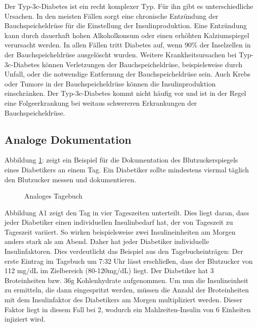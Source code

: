 \documentclass[a4paper,11pt]{article}%
\renewcommand{\\}{\vspace*{0.5\baselineskip} \newline}
\begin{document}
	Der Typ-3c-Diabetes ist ein recht komplexer Typ. Für ihn gibt es unterschiedliche Ursachen. In den meisten Fällen sorgt eine chronische Entzündung der Bauchspeicheldrüse für die Einstellung der Insulinproduktion. Eine Entzündung kann durch dauerhaft hohen Alkoholkonsum oder einen erhöhten Kalziumspiegel verursacht werden. In allen Fällen tritt Diabetes auf, wenn 90\% der Inselzellen in der Bauchspeicheldrüse ausgelöscht wurden. Weitere Krankheitsursachen bei Typ-3c-Diabetes können Verletzungen der Bauchspeicheldrüse, beispielsweise durch Unfall, oder die notwendige Entfernung der Bauchspeicheldrüse sein. Auch Krebs oder Tumore in der Bauchspeicheldrüse können die Insulinproduktion einschränken. Der Typ-3c-Diabetes kommt nicht häufig vor und ist in der Regel eine Folgeerkrankung bei weitaus schwereren Erkrankungen der Bauchspeicheldrüse. \cite{SG}
	\subsection{Analoge Dokumentation}
	Abbildung \ref{img:tagebuch}: \glqq {}\grqq{} zeigt ein Beispiel für die Dokumentation des Blutzuckerspiegels eines Diabetikers an einem Tag. Ein Diabetiker sollte mindestens viermal täglich den Blutzucker messen und dokumentieren.
	\begin{figure}[H]
		\centering
		\setlength{\fboxsep}{1pt}
		\setlength{\fboxrule}{1pt}
		\captionsetup{justification=centering}
		\caption{Analoges Tagebuch}
		\label{img:tagebuch}
	\end{figure}
	Abbildung A1 zeigt den Tag in vier Tageszeiten unterteilt. Dies liegt daran, dass jeder Diabetiker einen individuellen Insulinbedarf hat, der von Tageszeit zu Tageszeit variiert. So wirken beispielsweise zwei Insulineinheiten am Morgen anders stark als am Abend. Daher hat jeder Diabetiker individuelle Insulinfaktoren. Dies verdeutlicht das Beispiel aus den Tagebucheinträgen:\\
	Der erste Eintrag im Tagebuch um 7:32 Uhr lässt erschließen, dass der Blutzucker von 112 mg/dL im Zielbereich (80-120mg/dL) liegt. Der Diabetiker hat 3 Broteinheiten bzw. 36g Kohlenhydrate aufgenommen. Um nun die Insulineinheit zu ermitteln, die dann eingespritzt werden, müssen die Anzahl der Broteinheiten mit dem Insulinfaktor des Diabetikers am Morgen multipliziert werden. Dieser Faktor liegt in diesem Fall bei 2, wodurch ein Mahlzeiten-Insulin von 6 Einheiten injiziert wird.\newline
\end{document}
